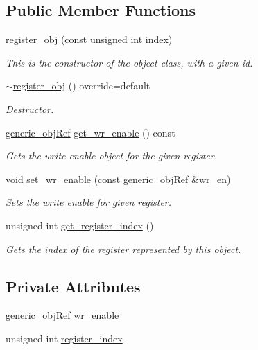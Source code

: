 \subsection*{Public Member Functions}
\begin{DoxyCompactItemize}
\item 
\hyperlink{classregister__obj_a8e082a6770bec3bc9b8c7708f83f0700}{register\+\_\+obj} (const unsigned int \hyperlink{tutorial__pact__2019_2Introduction_2third_2include_2Keccak_8h_a028c9bdc8344cca38ab522a337074797}{index})
\begin{DoxyCompactList}\small\item\em This is the constructor of the object class, with a given id. \end{DoxyCompactList}\item 
\hyperlink{classregister__obj_a7c3a2d727859f17885168283efe414e6}{$\sim$register\+\_\+obj} () override=default
\begin{DoxyCompactList}\small\item\em Destructor. \end{DoxyCompactList}\item 
\hyperlink{generic__obj_8hpp_acb533b2ef8e0fe72e09a04d20904ca81}{generic\+\_\+obj\+Ref} \hyperlink{classregister__obj_a9c059a18b70d315a984f9f541c52336b}{get\+\_\+wr\+\_\+enable} () const
\begin{DoxyCompactList}\small\item\em Gets the write enable object for the given register. \end{DoxyCompactList}\item 
void \hyperlink{classregister__obj_a0f2f1c1a134e03fb6aec5abebb5938f3}{set\+\_\+wr\+\_\+enable} (const \hyperlink{generic__obj_8hpp_acb533b2ef8e0fe72e09a04d20904ca81}{generic\+\_\+obj\+Ref} \&wr\+\_\+en)
\begin{DoxyCompactList}\small\item\em Sets the write enable for given register. \end{DoxyCompactList}\item 
unsigned int \hyperlink{classregister__obj_a772ea871c6bae46353122dcf6238edd8}{get\+\_\+register\+\_\+index} ()
\begin{DoxyCompactList}\small\item\em Gets the index of the register represented by this object. \end{DoxyCompactList}\end{DoxyCompactItemize}
\subsection*{Private Attributes}
\begin{DoxyCompactItemize}
\item 
\hyperlink{generic__obj_8hpp_acb533b2ef8e0fe72e09a04d20904ca81}{generic\+\_\+obj\+Ref} \hyperlink{classregister__obj_aa6abe3f4f66eb7f68519bfb511b162d5}{wr\+\_\+enable}
\item 
unsigned int \hyperlink{classregister__obj_a7c94f9776055fe5b6fa418ff58417086}{register\+\_\+index}
\end{DoxyCompactItemize}
